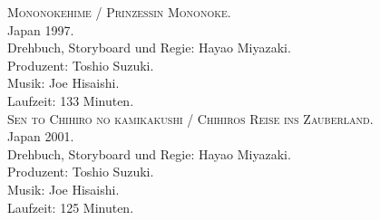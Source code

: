 \documentclass[a4paper]{article}
\begin{document}
\begin{thebibliography}{9}
	\textsc{Mononokehime / Prinzessin Mononoke}.\\
	Japan 1997. \\
	Drehbuch, Storyboard und Regie: Hayao Miyazaki.\\
	Produzent: Toshio Suzuki. \\
	Musik: Joe Hisaishi. \\
	Laufzeit: 133 Minuten. \\

	\textsc{Sen to Chihiro no kamikakushi / Chihiros Reise ins Zauberland}.\\ Japan 2001. \\
	Drehbuch, Storyboard und Regie: Hayao Miyazaki.\\
	Produzent: Toshio Suzuki. \\
	Musik: Joe Hisaishi. \\
	Laufzeit: 125 Minuten. \\

\end{thebibliography}
\end{document}
